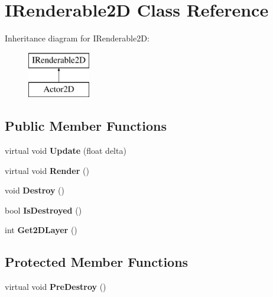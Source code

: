\hypertarget{classIRenderable2D}{}\section{I\+Renderable2\+D Class Reference}
\label{classIRenderable2D}
Inheritance diagram for I\+Renderable2\+D\+:\begin{figure}[H]
\begin{center}
\leavevmode
\includegraphics[height=2.000000cm]{classIRenderable2D}
\end{center}
\end{figure}
\subsection*{Public Member Functions}
\begin{DoxyCompactItemize}
\item 
\hypertarget{classIRenderable2D_acc3b3129a444ecadf45ec0ad000aa92c}{}virtual void {\bfseries Update} (float delta)\label{classIRenderable2D_acc3b3129a444ecadf45ec0ad000aa92c}

\item 
\hypertarget{classIRenderable2D_a8a462af175a5e739b96d6833d714772c}{}virtual void {\bfseries Render} ()\label{classIRenderable2D_a8a462af175a5e739b96d6833d714772c}

\item 
\hypertarget{classIRenderable2D_ae4d37c880f417d12b9ded4a486719fa2}{}void {\bfseries Destroy} ()\label{classIRenderable2D_ae4d37c880f417d12b9ded4a486719fa2}

\item 
\hypertarget{classIRenderable2D_afc585cdcf0697bdf6ee691836df40029}{}bool {\bfseries Is\+Destroyed} ()\label{classIRenderable2D_afc585cdcf0697bdf6ee691836df40029}

\item 
\hypertarget{classIRenderable2D_abc4275273450d0200dbba48662b842d6}{}int {\bfseries Get2\+D\+Layer} ()\label{classIRenderable2D_abc4275273450d0200dbba48662b842d6}

\end{DoxyCompactItemize}
\subsection*{Protected Member Functions}
\begin{DoxyCompactItemize}
\item 
\hypertarget{classIRenderable2D_ab28305f75adffc51d7cfae5be4ed0aeb}{}virtual void {\bfseries Pre\+Destroy} ()\label{classIRenderable2D_ab28305f75adffc51d7cfae5be4ed0aeb}

\end{DoxyCompactItemize}
